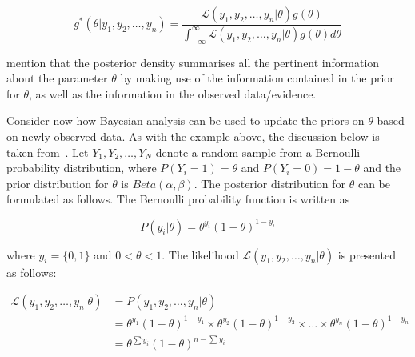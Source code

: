 \begin{equation}
      \label{eq:probability:bayesian_statistic:bayesian_analysis:posterior_density}
      g^{*}(\theta \vert y_{1}, y_{2}, \dots, y_{n}) = \frac{\mathcal{L}(y_{1}, y_{2}, \dots, y_{n} \vert \theta)g(\theta)}{\int_{-\infty}^{\infty} \mathcal{L}(y_{1}, y_{2}, \dots, y_{n} \vert \theta)g(\theta)d\theta}
\end{equation}

\citeauthor{ref:wackerly:2014}\cite{ref:wackerly:2014} mention that the posterior density summarises all the pertinent information about the parameter $\theta$ by making use of the information contained in the prior for $\theta$, as well as the information in the observed data/evidence.

Consider now how Bayesian analysis can be used to update the priors on $\theta$ based on newly observed data. As with the example above, the discussion below is taken from~\cite{ref:wackerly:2014}. Let $Y_{1}, Y_{2}, \dots, Y_{N}$ denote a random sample from a Bernoulli probability distribution, where $P(Y_{i} = 1) = \theta$ and $P(Y_{i} = 0) = 1 - \theta$ and the prior distribution for $\theta$ is $Beta(\alpha, \beta)$. The posterior distribution for $\theta$ can be formulated as follows. The Bernoulli probability function is written as

\begin{equation}
      \label{eq:probability:bayesian_statistic:bayesian_analysis:step_1}
      P(y_{i} \vert \theta) = \theta^{y_{i}}(1 - \theta)^{1-y_{i}}
\end{equation}

where $y_{i} = \{0,1\}$ and $0 < \theta < 1$. The likelihood $\mathcal{L}(y_{1}, y_{2}, \dots, y_{n} \vert \theta)$ is presented as follows:

\begin{equation}
      \label{eq:probability:bayesian_statistic:bayesian_analysis:step_2}
      \begin{split}
            \mathcal{L}(y_{1}, y_{2}, \dots, y_{n} \vert \theta)
            &= P(y_{1}, y_{2}, \dots, y_{n} \vert \theta)\\
            &= \theta^{y_{1}}(1-\theta)^{1 - y_{1}} \times \theta^{y_{2}}(1-\theta)^{1 - y_{2}} \times \dots \times \theta^{y_{n}}(1-\theta)^{1 - y_{n}}\\
            &= \theta^{\sum y_{i}}(1-\theta)^{n-\sum y_{i}}
      \end{split}
\end{equation}


